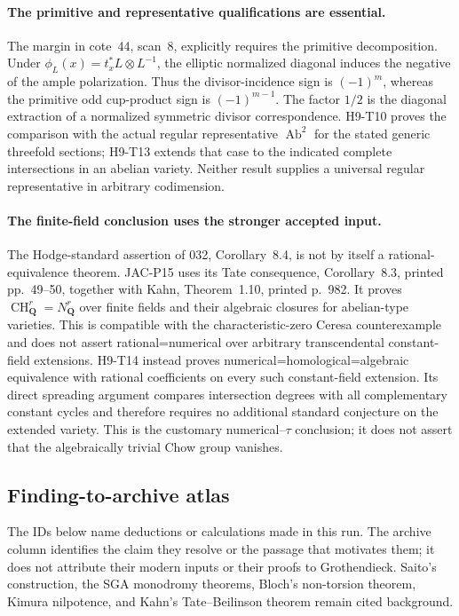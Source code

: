 \paragraph{The primitive and representative qualifications are essential.}
The margin in cote~44, scan~8, explicitly requires the primitive
decomposition. Under $\phi_L(x)=t_x^*L\otimes L^{-1}$, the
elliptic normalized diagonal induces the negative of the ample
polarization. Thus the divisor-incidence sign is $(-1)^m$,
whereas the primitive odd cup-product sign is $(-1)^{m-1}$.
The factor $1/2$ is the diagonal extraction of a normalized
symmetric divisor correspondence. H9-T10 proves the comparison
with the actual regular representative $\operatorname{Ab}^2$
for the stated generic threefold sections; H9-T13 extends that
case to the indicated complete intersections in an abelian variety.
Neither result supplies a universal regular representative in
arbitrary codimension.

\paragraph{The finite-field conclusion uses the stronger accepted input.}
The Hodge-standard assertion of 032, Corollary~8.4, is not by
itself a rational-equivalence theorem. JAC-P15 uses its Tate
consequence, Corollary~8.3, printed pp.~49--50, together with
Kahn, Theorem~1.10, printed p.~982. It proves
$\operatorname{CH}^r_{\mathbf Q}=N^r_{\mathbf Q}$ over finite
fields and their algebraic closures for abelian-type varieties.
This is compatible with the characteristic-zero Ceresa
counterexample and does not assert rational=numerical over
arbitrary transcendental constant-field extensions.
H9-T14 instead proves numerical=homological=algebraic equivalence
with rational coefficients on every such constant-field
extension. Its direct spreading argument compares intersection
degrees with all complementary constant cycles and therefore
requires no additional standard conjecture on the extended
variety. This is the customary numerical--$\tau$ conclusion;
it does not assert that the algebraically trivial Chow group vanishes.

\subsection*{Finding-to-archive atlas}

The IDs below name deductions or calculations made in this run.
The archive column identifies the claim they resolve or the
passage that motivates them; it does not attribute their modern
inputs or their proofs to Grothendieck. Saito's construction,
the SGA monodromy theorems, Bloch's non-torsion theorem, Kimura
nilpotence, and Kahn's Tate--Beilinson theorem remain cited
background.

